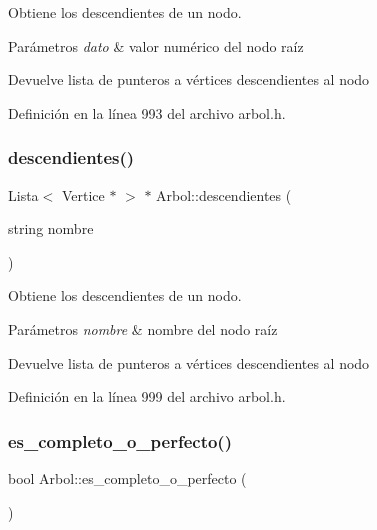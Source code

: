 Obtiene los descendientes de un nodo. 


\begin{DoxyParams}{Parámetros}
{\em dato} & valor numérico del nodo raíz \\
\hline
\end{DoxyParams}
\begin{DoxyReturn}{Devuelve}
lista de punteros a vértices descendientes al nodo 
\end{DoxyReturn}


Definición en la línea 993 del archivo arbol.\+h.

\mbox{\label{classArbol_a790b07f284b14bd179499eb4a991ad86}} 
\subsubsection{\texorpdfstring{descendientes()}{descendientes()}\hspace{0.1cm}{\footnotesize\ttfamily [2/2]}}
{\footnotesize\ttfamily Lista$<$ Vertice $\ast$ $>$ $\ast$ Arbol\+::descendientes (\begin{DoxyParamCaption}\item[{string}]{nombre }\end{DoxyParamCaption})}



Obtiene los descendientes de un nodo. 


\begin{DoxyParams}{Parámetros}
{\em nombre} & nombre del nodo raíz \\
\hline
\end{DoxyParams}
\begin{DoxyReturn}{Devuelve}
lista de punteros a vértices descendientes al nodo 
\end{DoxyReturn}


Definición en la línea 999 del archivo arbol.\+h.

\mbox{\label{classArbol_a9e472df85f3bb1aa5c90f8157ad6ff22}} 
\subsubsection{\texorpdfstring{es\+\_\+completo\+\_\+o\+\_\+perfecto()}{es\_completo\_o\_perfecto()}}
{\footnotesize\ttfamily bool Arbol\+::es\+\_\+completo\+\_\+o\+\_\+perfecto (\begin{DoxyParamCaption}{ }\end{DoxyParamCaption})}



